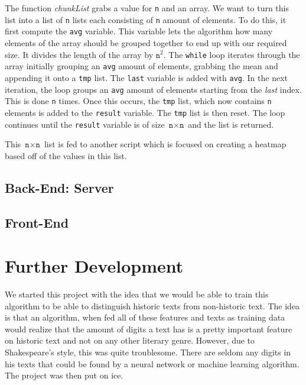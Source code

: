 \documentclass[runningheads]{llncs}
\begin{document}
\begin{python}
The function \textit{chunkList} grabs a value for \texttt{n} and an array. We want to turn this list into a list of \texttt{n} lists each consisting of \texttt{n} amount of elements. To do this, it first compute the \texttt{avg} variable. This variable lets the algorithm how many elements of the array should be grouped together to end up with our required size. It divides the length of the array by $\texttt{n}^2$. The \texttt{while} loop iterates through the array initially grouping an \texttt{avg} amount of elements, grabbing the mean and appending it onto a \texttt{tmp} list. The \texttt{last} variable is added with \texttt{avg}. In the next iteration, the loop groups an \texttt{avg} amount of elements starting from the \textit{last} index. This is done \texttt{n} times. Once this occurs, the \texttt{tmp} list, which now contains \texttt{n} elements is added to the \texttt{result} variable. The \texttt{tmp} list is then reset. The loop continues until the \texttt{result} variable is of size $\texttt{n} \times \texttt{n}$ and the list is returned. 

This $\texttt{n} \times \texttt{n}$ list is fed to another script which is focused on creating a heatmap based off of the values in this list.
\subsection{Back-End: Server}

\subsection{Front-End}







\section{Further Development}

We started this project with the idea that we would be able to train this algorithm to be able to distinguish historic texts from non-historic text. The idea is that an algorithm, when fed all of these features and texts as training data would realize that the amount of digits a text has is a pretty important feature on historic text and not on any other literary genre. However, due to Shakespeare's style, this was quite troublesome. There are seldom any digits in his texts that could be found by a neural network or machine learning algorithm. The project was then put on ice. 


\end{python}
\end{document}
